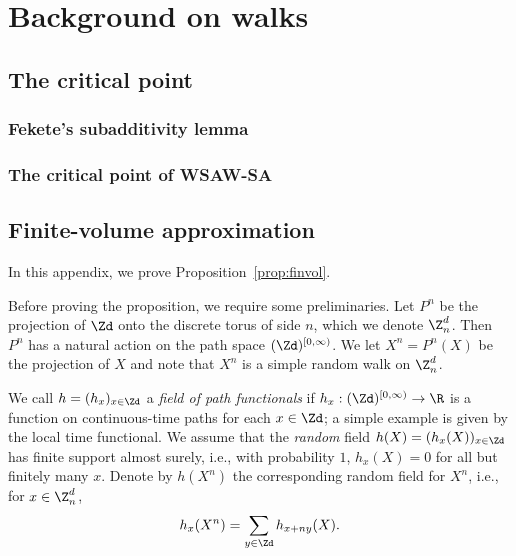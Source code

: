 \chapter{Background on walks}
\label{sec:finvol}


\section{The critical point}

\subsection{Fekete's subadditivity lemma}

\subsection{The critical point of WSAW-SA}


\section{Finite-volume approximation}

In this appendix, we prove Proposition~\ref{prop:finvol}.


Before proving the proposition, we require some preliminaries.
Let $P^n$ be the projection
of $\Zd$ onto the discrete torus of side $n$,
which we denote $\Z_n^d$.
Then $P^n$ has a natural action
on the path space $(\Zd)^{[0,\infty)}$. We let
$X^n = P^n(X)$ be the projection of $X$
and note that $X^n$ is a simple random walk on $\Z^d_n$.

We call $h = (h_x)_{x\in\Zd}$ a \emph{field of path functionals} if
$h_x : (\Zd)^{[0,\infty)} \to \R$ is a function on continuous-time paths
for each $x \in \Zd$;
a simple example is given by the local time functional.
We assume that the \emph{random} field $h(X) = (h_x(X))_{x\in\Zd}$
has finite support almost surely, i.e.,
with probability $1$, $h_x(X) = 0$ for all but finitely many $x$.
Denote by $h(X^n)$ the corresponding random field for $X^n$, i.e., for $x \in \Z_n^d$,
\begin{equation}
h_x(X^n) = \sum_{y\in\Zd} h_{x+ny}(X).
\end{equation}

